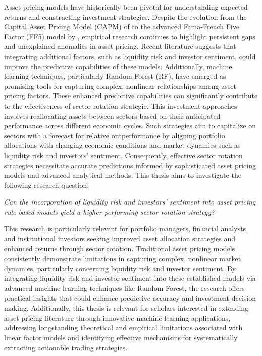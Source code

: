 Asset pricing models have historically been pivotal for understanding expected returns and constructing investment strategies. Despite the evolution from the Capital Asset Pricing Model (CAPM) of  to the advanced Fama-French Five Factor (FF5) model by , empirical research continues to highlight persistent gaps and unexplained anomalies in asset pricing. Recent literature suggests that integrating additional factors, such as liquidity risk and investor sentiment, could improve the predictive capabilities of these models. Additionally, machine learning techniques, particularly Random Forest (RF), have emerged as promising tools for capturing complex, nonlinear relationships among asset pricing factors. These enhanced predictive capabilities can significantly contribute to the effectiveness of sector rotation strategie. This investment approaches involves reallocating assets between sectors based on their anticipated performance across different economic cycles. Such strategies aim to capitalize on sectors with a forecast for relative outperformance by aligning portfolio allocations with changing economic conditions and market dynamics-such as liquidity risk and investors' sentiment. Consequently, effective sector rotation strategies necessitate accurate predictions informed by sophisticated asset pricing models and advanced analytical methods. This thesis aims to investigate the following research question: 

\begin{center}
    \textit{Can the incorporation of liquidity risk and investors' sentiment into asset pricing rule based models yield a higher performing sector rotation strategy?}
\end{center}

This research is particularly relevant for portfolio managers, financial analysts, and institutional investors seeking improved asset allocation strategies and enhanced returns through sector rotation. Traditional asset pricing models consistently demonstrate limitations in capturing complex, nonlinear market dynamics, particularly concerning liquidity risk and investor sentiment. By integrating liquidity risk and investor sentiment into these established models via advanced machine learning techniques like Random Forest, the research offers practical insights that could enhance predictive accuracy and investment decision-making. Additionally, this thesis is relevant for scholars interested in extending asset pricing literature through innovative machine learning applications, addressing longstanding theoretical and empirical limitations associated with linear factor models and identifying effective mechanisms for systematically extracting actionable trading strategies.
